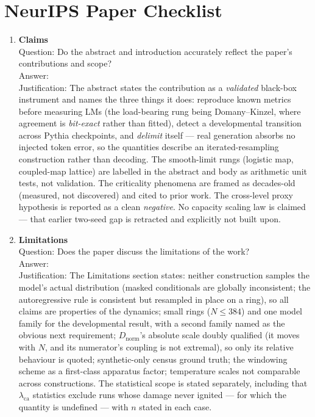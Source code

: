 \newpage
\section*{NeurIPS Paper Checklist}

\begin{enumerate}
\item {\bf Claims} \\
Question: Do the abstract and introduction accurately reflect the paper's contributions and scope? \\
Answer: \answerYes{} \\
Justification: The abstract states the contribution as a \emph{validated} black-box instrument and names the three things it does: reproduce known metrics before measuring LMs (the load-bearing rung being Domany--Kinzel, where agreement is \emph{bit-exact} rather than fitted), detect a developmental transition across Pythia checkpoints, and \emph{delimit} itself --- real generation absorbs no injected token error, so the quantities describe an iterated-resampling construction rather than decoding. The smooth-limit rungs (logistic map, coupled-map lattice) are labelled in the abstract and body as arithmetic unit tests, not validation. The criticality phenomena are framed as decades-old (measured, not discovered) and cited to prior work. The cross-level proxy hypothesis is reported as a clean \emph{negative}. No capacity scaling law is claimed --- that earlier two-seed gap is retracted and explicitly not built upon.

\item {\bf Limitations} \\
Question: Does the paper discuss the limitations of the work? \\
Answer: \answerYes{} \\
Justification: The Limitations section states: neither construction samples the model's actual distribution (masked conditionals are globally inconsistent; the autoregressive rule is consistent but resampled in place on a ring), so all claims are properties of the dynamics; small rings ($N\le384$) and one model family for the developmental result, with a second family named as the obvious next requirement; $D_{\mathrm{norm}}$'s absolute scale doubly qualified (it moves with $N$, and its numerator's coupling is not extremal), so only its relative behaviour is quoted; synthetic-only census ground truth; the windowing scheme as a first-class apparatus factor; temperature scales not comparable across constructions. The statistical scope is stated separately, including that $\lambda_{\mathrm{ca}}$ statistics exclude runs whose damage never ignited --- for which the quantity is undefined --- with $n$ stated in each case.


\end{enumerate}
